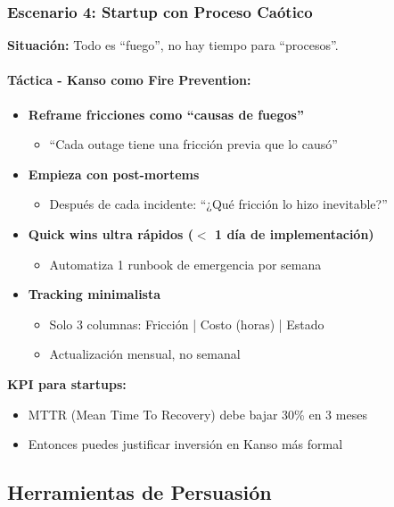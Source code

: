 \subsubsection*{Escenario 4: Startup con Proceso Caótico}

\textbf{Situación:} Todo es ``fuego'', no hay tiempo para ``procesos''.

\paragraph{Táctica - Kanso como Fire Prevention:}

\begin{itemize}
    \item \textbf{Reframe fricciones como ``causas de fuegos''}
    \begin{itemize}
        \item ``Cada outage tiene una fricción previa que lo causó''
    \end{itemize}
    \item \textbf{Empieza con post-mortems}
    \begin{itemize}
        \item Después de cada incidente: ``¿Qué fricción lo hizo inevitable?''
    \end{itemize}
    \item \textbf{Quick wins ultra rápidos ($<$ 1 día de implementación)}
    \begin{itemize}
        \item Automatiza 1 runbook de emergencia por semana
    \end{itemize}
    \item \textbf{Tracking minimalista}
    \begin{itemize}
        \item Solo 3 columnas: Fricción | Costo (horas) | Estado
        \item Actualización mensual, no semanal
    \end{itemize}
\end{itemize}

\textbf{KPI para startups:}
\begin{itemize}
    \item MTTR (Mean Time To Recovery) debe bajar 30\% en 3 meses
    \item Entonces puedes justificar inversión en Kanso más formal
\end{itemize}

\subsection*{Herramientas de Persuasión}

